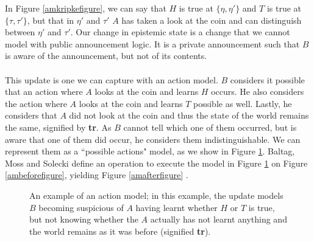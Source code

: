 In Figure \ref{amkripkefigure}, we can say that $H$ is true at $\{\eta,\eta'\}$ and $T$ is
true at $\{\tau,\tau'\}$, but that in $\eta'$ and $\tau'$ $A$ has taken a look
at the coin and can distinguish between $\eta'$ and $\tau'$.
Our change in epistemic state is a change that we cannot model with public
announcement logic.
It is a private announcement such that $B$ is aware of the announcement, but not
of its contents.\\
\\
This update is one we can capture with an action model.
$B$ considers it possible that an action where $A$ looks at the coin and learns
$H$ occurs.
He also considers the action where $A$ looks at the coin and learns $T$ possible
as well.
Lastly, he considers that $A$ did not look at the coin and thus the state of the
world remains the same, signified by {\bf tr}.
As $B$ cannot tell which one of them occurred, but is aware that one of them did
occur, he considers them indistinguishable.
We can represent them as a ``possible actions" model, as we show in Figure
\ref{amprivatea}.
Baltag, Moss and Solecki define an operation to execute the model in Figure
\ref{amprivatea} on Figure \ref{ambeforefigure}, yielding Figure
\ref{amafterfigure} \cite{baltag1998lpa}.

\begin{figure}[H]
\centering
{}
\caption[Example action model]{An example of an action model; in this example, the update models $B$
becoming suspicious of $A$ having learnt whether $H$ or $T$ is true, but not
knowing whether the $A$ actually has not learnt anything and the world remains
as it was before (signified {\bf tr}).}
\label{amprivatea}
\end{figure}

